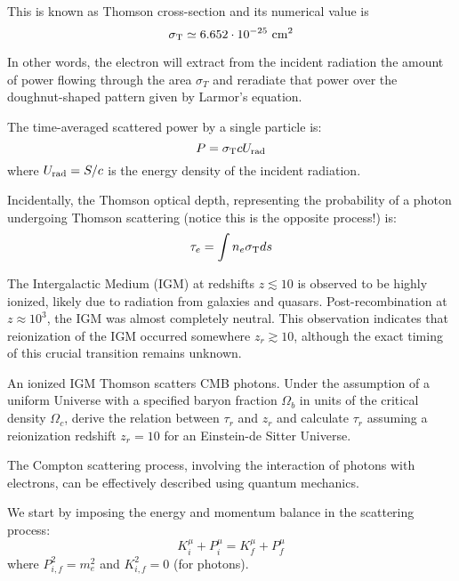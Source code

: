 This is known as Thomson cross-section and its numerical value is 
%
\begin{equation*}
\sigma_{\rm T} \simeq 6.652 \cdot 10^{-25}~\text{cm}^2
\end{equation*}

In other words, the electron will extract from the incident radiation the amount of power flowing through the area $\sigma_T$ and reradiate that power over the doughnut-shaped pattern given by Larmor’s equation.



The time-averaged scattered power by a single particle is:
%
\[
P = \sigma_{\rm T} c U_{\rm rad}
\]
%
where \( U_{\rm rad} = S /c \) is the energy density of the incident radiation.

Incidentally, the Thomson optical depth, representing the probability of a photon undergoing Thomson scattering (notice this is the opposite process!) is:
%
\[
\tau_e = \int n_e \sigma_{\rm T} ds
\]

\begin{problem}
The Intergalactic Medium (IGM) at redshifts \( z \lesssim 10 \) is observed to be highly ionized, likely due to radiation from galaxies and quasars. Post-recombination at \( z \approx 10^3 \), the IGM was almost completely neutral. This observation indicates that reionization of the IGM occurred somewhere \( z_r \gtrsim 10 \), although the exact timing of this crucial transition remains unknown. 

An ionized IGM Thomson scatters CMB photons. Under the assumption of a uniform Universe with a specified baryon fraction \( \Omega_b \) in units of the critical density \( \Omega_c \), derive the relation between \( \tau_r \) and \( z_r \) and calculate \( \tau_r \) assuming a reionization redshift \( z_r = 10 \) for an Einstein-de Sitter Universe.
\end{problem}

The Compton scattering process, involving the interaction of photons with electrons, can be effectively described using quantum mechanics.

We start by imposing the energy and momentum balance in the scattering process:
%
\[
K_i^\mu + P_i^\mu = K_f^\mu + P_f^\mu
\]
%
where \( P_{i,f}^2 = m_e^2 \) and \( K_{i,f}^2 = 0 \) (for photons).


